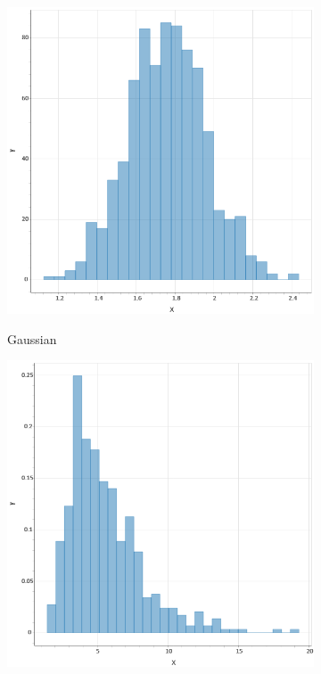 \begin{figure}
    \centering
    \begin{subfigure}[b]{0.19\textwidth}    
        \centering
        \includegraphics[width=\textwidth]{figures/body/methodology/norm_hist.png}
        \label{figure: norm_hist}
        \caption{Gaussian}
    \end{subfigure}
    \hfill
    \begin{subfigure}[b]{0.19\textwidth}
        \centering
        \includegraphics[width=\textwidth]{figures/body/methodology/lognorm_hist.png}

\end{subfigure}
\end{figure}
